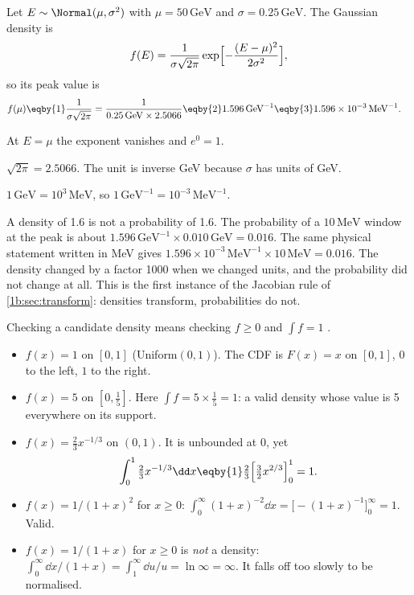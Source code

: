 \label{1b:ex:density-units}
Let $E\sim\Normal(\mu,\sigma^2)$ with $\mu=50\,\mathrm{GeV}$ and
$\sigma=0.25\,\mathrm{GeV}$. The Gaussian density is
\[
  f(E)=\frac{1}{\sigma\sqrt{2\pi}}\exp\Bigl[-\frac{(E-\mu)^2}{2\sigma^2}\Bigr],
\]
so its peak value is
\begin{align*}
  f(\mu)
  &\eqby{1} \frac{1}{\sigma\sqrt{2\pi}}
   = \frac{1}{0.25\,\mathrm{GeV}\times2.5066}
   \eqby{2} 1.596\,\mathrm{GeV}^{-1}
   \eqby{3} 1.596\times10^{-3}\,\mathrm{MeV}^{-1}.
\end{align*}
\begin{explain}
  \item At $E=\mu$ the exponent vanishes and $e^0=1$.
  \item $\sqrt{2\pi}=2.5066$. The unit is inverse GeV because $\sigma$ has
        units of GeV.
  \item $1\,\mathrm{GeV}=10^3\,\mathrm{MeV}$, so
        $1\,\mathrm{GeV}^{-1}=10^{-3}\,\mathrm{MeV}^{-1}$.
\end{explain}
A density of 1.6 is not a probability of 1.6. The probability of a
$10\,\mathrm{MeV}$ window at the peak is about
$1.596\,\mathrm{GeV}^{-1}\times0.010\,\mathrm{GeV}=0.016$. The same physical
statement written in MeV gives
$1.596\times10^{-3}\,\mathrm{MeV}^{-1}\times10\,\mathrm{MeV}=0.016$. The
density changed by a factor 1000 when we changed units, and the probability
did not change at all. This is the first instance of the Jacobian rule of
\cref{1b:sec:transform}: densities transform, probabilities do not.

\label{1b:ex:valid-pdf}
Checking a candidate density means checking $f\ge0$ and $\int f=1$
.
\begin{itemize}[leftmargin=1.2em,itemsep=1pt]
  \item $f(x)=1$ on $[0,1]$ (Uniform$(0,1)$). The CDF is $F(x)=x$ on $[0,1]$,
        $0$ to the left, $1$ to the right.
  \item $f(x)=5$ on $[0,\tfrac15]$. Here $\int f=5\times\tfrac15=1$: a valid
        density whose value is 5 everywhere on its support.
  \item $f(x)=\tfrac23x^{-1/3}$ on $(0,1)$. It is unbounded at 0, yet
        \begin{align*}
          \int_0^1\tfrac23x^{-1/3}\dd x
          \eqby{1} \tfrac23\Bigl[\tfrac32x^{2/3}\Bigr]_0^1 = 1 .
        \end{align*}
  \item $f(x)=1/(1+x)^2$ for $x\ge0$: $\int_0^\infty(1+x)^{-2}\dd x
        =\bigl[-(1+x)^{-1}\bigr]_0^\infty=1$. Valid.
  \item $f(x)=1/(1+x)$ for $x\ge0$ is \emph{not} a density:
        $\int_0^\infty\dd x/(1+x)=\int_1^\infty\dd u/u=\ln\infty=\infty$. It
        falls off too slowly to be normalised.
\end{itemize}

